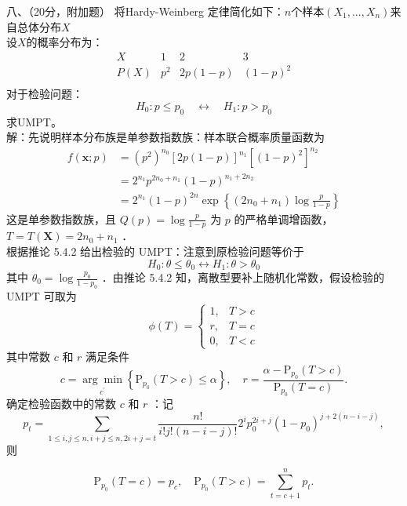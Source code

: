 \documentclass[UTF8]{ctexart}
\begin{document}
\noindent 八、（20分，附加题）
将Hardy-Weinberg 定律简化如下：$n$个样本$(X_1,...,X_n)$来自总体分布$X$\\
设$X$的概率分布为：
\[
\begin{array}{c|ccc}
X & 1 & 2 & 3 \\ \hline
P(X) & p^2 & 2p(1-p) & (1-p)^2 \\
\end{array}
\]
对于检验问题：
\[
H_0: p \leq p_0 \quad \leftrightarrow \quad H_1: p > p_0
\]
求UMPT。\\
解：先说明样本分布族是单参数指数族：样本联合概率质量函数为
$$
\begin{aligned}
	f(\boldsymbol{x} ; p) & =\left(p^2\right)^{n_0}[2 p(1-p)]^{n_1}\left[(1-p)^2\right]^{n_2} \\
	& =2^{n_1} p^{2 n_0+n_1}(1-p)^{n_1+2 n_2}\\
	&=2^{n_1}(1-p)^{2 n} \exp \left\{\left(2 n_0+n_1\right) \log \frac{p}{1-p}\right\}
\end{aligned}
$$
这是单参数指数族，且 $Q(p)=\log \frac{p}{1-p}$ 为 $p$ 的严格单调增函数，$T=T(\boldsymbol{X})=2 n_0+n_1$ ．\\
根据推论 5.4.2 给出检验的 UMPT：注意到原检验问题等价于
$$
H_0: \theta \leq \theta_0 \longleftrightarrow H_1: \theta>\theta_0
$$
其中 $\theta_0=\log \frac{p_0}{1-p_0}$ ．由推论 5.4.2 知，离散型要补上随机化常数，假设检验的 UMPT 可取为
$$
\phi(T)= \begin{cases}1, & T>c \\ r, & T=c \\ 0, & T<c\end{cases}
$$
其中常数 $c$ 和 $r$ 满足条件
$$
c=\underset{c^{\prime}}{\arg \min }\left\{\mathrm{P}_{p_0}(T>c) \leq \alpha\right\}, \quad r=\frac{\alpha-\mathrm{P}_{p_0}(T>c)}{\mathrm{P}_{p_0}(T=c)} .
$$
确定检验函数中的常数 $c$ 和 $r$ ：记
$$
p_t=\sum_{1 \leq i, j \leq n, i+j \leq n, 2 i+j=t} \frac{n!}{i!j!(n-i-j)!} 2^i p_0^{2 i+j}\left(1-p_0\right)^{j+2(n-i-j)},
$$
则

$$
\mathrm{P}_{p_0}(T=c)=p_c, \quad \mathrm{P}_{p_0}(T>c)=\sum_{t=c+1}^n p_t .
$$
\end{document}
